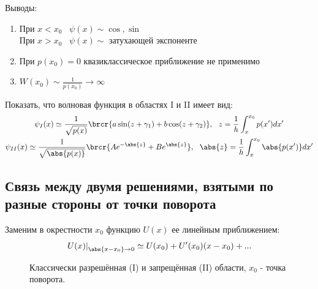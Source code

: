 Выводы:
\renewcommand{\labelenumi}{\arabic{enumi})}
\begin{enumerate}
\item При $x<x_0$~ $\psi(x) \sim \cos, \sin$\\
При $x>x_0$~ $\psi(x) \sim$ затухающей экспоненте
\item При $p(x_0) = 0$ квазиклассическое приближение не применимо
\item $W(x_0) \sim \frac{1}{p(x_0)} \to \infty$
\end{enumerate}

\begin{excr}
Показать, что волновая функция в областях I и II имеет вид:
$$
\begin{gathered}
\psi_I(x) \simeq \frac{1}{\sqrt{p(x)}} \brcr{a \sin(z+\gamma_1) + b \cos(z+\gamma_2)},~~ z = \frac{1}{h}\int_x^{x_0} p(x')dx'\\
\psi_{II}(x) \simeq \frac{1}{\sqrt{\abs{p(x)}}} \brcr{A e^{-\abs{z}} + B e^{\abs{z}}},~~ \abs{z} = \frac{1}{h}\int_x^{x_0} \abs{p(x')}dx'
\end{gathered}
$$
\end{excr}

\subsection{Связь между двумя решениями, взятыми по разные стороны от точки поворота}
Заменим в окрестности $x_0$ функцию $U(x)$ ее линейным приближением:
$$
\left. U(x) \right|_{\abs{x-x_0} \to 0} \simeq U(x_0) + U'(x_0)(x-x_0)+...
$$

\begin{figure}[h!]
\centering
{}
\caption{Классически разрешённая (I) и запрещённая (II) области, $x_0$ - точка поворота.} \label{fig:2}
\end{figure}


